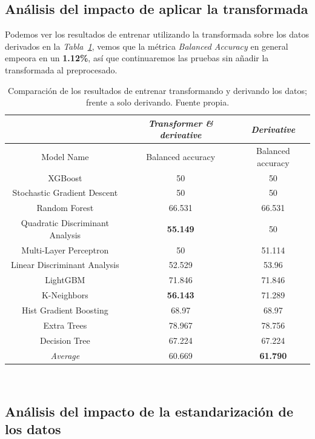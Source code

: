 \subsection{Análisis del impacto de aplicar la transformada}

Podemos ver los resultados de entrenar utilizando la transformada sobre los datos derivados en la \textit{Tabla\ \ref{tab:derivative-transformed-results}}, vemos que la métrica \textit{Balanced Accuracy} en general empeora en un \textbf{1.12\%}, así que continuaremos las pruebas sin añadir la transformada al preprocesado.

\begin{table}[!h]
    \centering
    \begin{tabular}{|c|c|c|}
        \hline
            & \textit{Transformer \& derivative} & \textit{Derivative} \\ \hline
            Model Name & Balanced accuracy & Balanced accuracy \\ \hline
            XGBoost & 50 & 50 \\ 
            Stochastic Gradient Descent & 50 & 50 \\ 
            Random Forest & 66.531 & 66.531 \\ 
            Quadratic Discriminant Analysis & \textbf{55.149} & 50 \\ 
            Multi-Layer Perceptron & 50 & 51.114 \\ 
            Linear Discriminant Analysis & 52.529 & 53.96 \\ 
            LightGBM & 71.846 & 71.846 \\ 
            K-Neighbors & \textbf{56.143} & 71.289 \\ 
            Hist Gradient Boosting & 68.97 & 68.97 \\ 
            Extra Trees & 78.967 & 78.756 \\ 
            Decision Tree & 67.224 & 67.224 \\ \hline
            \textit{Average} & 60.669 & \textbf{61.790} \\ \hline
    \end{tabular}
    \caption{Comparación de los resultados de entrenar transformando y derivando los datos; frente a solo derivando. Fuente propia.}\ \label{tab:derivative-transformed-results}
\end{table}

\subsection{Análisis del impacto de la estandarización de los datos}

